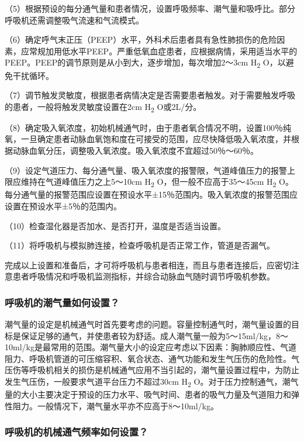 （5）根据预设的每分通气量和患者情况，设置呼吸频率、潮气量和吸呼比。部分呼吸机还需调整吸气流速和气流模式。

（6）确定呼气末正压（PEEP）水平，外科术后患者具有急性肺损伤的危险因素，应常规加用低水平PEEP。严重低氧血症患者，应根据病情，采用适当水平的PEEP。PEEP的调节原则是从小到大，逐步增加，每次增加2～3cm
H\textsubscript{2} O，以避免干扰循环。

（7）调节触发灵敏度，根据患者病情决定是否需要患者触发。对于需要触发呼吸的患者，一般将触发灵敏度设置在2cm
H\textsubscript{2} O或2L/分。

（8）确定吸入氧浓度，初始机械通气时，由于患者氧合情况不明，设置100％纯氧，一旦确定患者动脉血氧饱和度在可接受的范围，应尽快降低吸入氧浓度，并根据动脉血氧分压，调整吸入氧浓度。吸入氧浓度不宜超过50％～60％。

（9）设定气道压力、每分通气量、吸入氧浓度的报警限，气道峰值压力的报警上限应维持在气道峰值压力之上5～10cm
H\textsubscript{2} O，但一般不应高于35～45cm H\textsubscript{2}
O。每分通气量的报警范围应设置在预设水平±15％范围内。吸入氧浓度的报警范围应设置在预设水平±5％的范围内。

（10）检查湿化器是否加水、是否打开，温度是否适当设置。

（11）将呼吸机与模拟肺连接，检查呼吸机是否正常工作，管道是否漏气。

完成以上设置和准备后，才可将呼吸机与患者相连，而且与患者连接后，应密切注意患者呼吸情况和呼吸机监测指标，并综合动脉血气随时调节呼吸机参数。

\subsubsection{呼吸机的潮气量如何设置？}

潮气量的设定是机械通气时首先要考虑的问题。容量控制通气时，潮气量设置的目标是保证足够的通气，并使患者较为舒适。成人潮气量一般为5～15ml/kg，8～10ml/kg是最常用的范围。潮气量大小的设定应考虑以下因素：胸肺顺应性、气道阻力、呼吸机管道的可压缩容积、氧合状态、通气功能和发生气压伤的危险性。气压伤等呼吸机相关的损伤是机械通气应用不当引起的，潮气量设置过程中，为防止发生气压伤，一般要求气道平台压力不超过30cm
H\textsubscript{2}
O。对于压力控制通气，潮气量的大小主要决定于预设的压力水平、吸气时间、患者的吸气力量及气道阻力和弹性阻力。一般情况下，潮气量水平亦不应高于8～10ml/kg。

\subsubsection{呼吸机的机械通气频率如何设置？}

